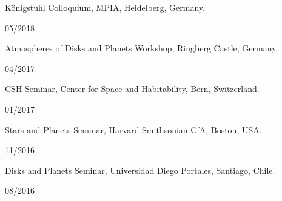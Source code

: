\documentclass[12pt, a4paper]{article} %
\begin{document}
\begin{minipage}[t]{0.7\textwidth}
\begin{flushleft}%
  \setlength{\leftskip}{0.2cm}%
Königstuhl Colloquium, MPIA, Heidelberg, Germany.
\end{flushleft}
\end{minipage}
\begin{minipage}[t]{0.3\textwidth}
\hfill 05/2018
\end{minipage}

\begin{minipage}[t]{0.7\textwidth}
\begin{flushleft}%
  \setlength{\leftskip}{0.2cm}%
Atmospheres of Disks and Planets Workshop, Ringberg Castle, Germany.
\end{flushleft}
\end{minipage}
\begin{minipage}[t]{0.3\textwidth}
\hfill 04/2017
\end{minipage}

\begin{minipage}[t]{0.7\textwidth}
\begin{flushleft}%
  \setlength{\leftskip}{0.2cm}%
CSH Seminar, Center for Space and Habitability, Bern, Switzerland.
\end{flushleft}
\end{minipage}
\begin{minipage}[t]{0.3\textwidth}
\hfill 01/2017
\end{minipage}

\begin{minipage}[t]{0.7\textwidth}
\begin{flushleft}%
  \setlength{\leftskip}{0.2cm}%
Stars and Planets Seminar, Harvard-Smithsonian CfA, Boston, USA.
\end{flushleft}
\end{minipage}
\begin{minipage}[t]{0.3\textwidth}
\hfill 11/2016
\end{minipage}


\begin{minipage}[t]{0.7\textwidth}
\begin{flushleft}%
  \setlength{\leftskip}{0.2cm}%
Disks and Planets Seminar, Universidad Diego Portales, Santiago, Chile.
\end{flushleft}
\end{minipage}
\begin{minipage}[t]{0.3\textwidth}
\hfill 08/2016
\end{minipage}
\end{document}
